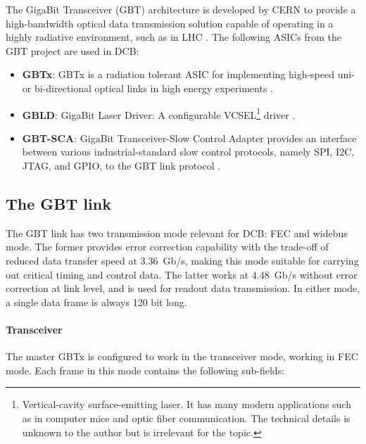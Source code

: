The GigaBit Transceiver (GBT) architecture is developed by CERN to provide a
high-bandwidth optical data transmission solution capable of operating in a
highly radiative environment, such as in LHC \cite{P_Moreira_2010}.
The following ASICs from the GBT project are used in DCB:

\begin{itemize}
    \item \textbf{GBTx}:
        GBTx is a radiation tolerant ASIC for implementing high-speed
        uni- or bi-directional optical links in high energy experiments
        \cite{gbtx_manual}.

    \item \textbf{GBLD}:
        GigaBit Laser Driver:
        A configurable VCSEL\footnote{
            Vertical-cavity surface-emitting laser.
            It has many modern applications such as in computer mice and optic
            fiber communication.
            The technical details is unknown to the author but is irrelevant
            for the topic.
        } driver
        \cite{gbld_manual}.

    \item \textbf{GBT-SCA}:
        GigaBit Transceiver-Slow Control Adapter provides an interface between
        various industrial-standard slow control protocols,
        namely SPI, I2C, JTAG, and GPIO, to the GBT link protocol
        \cite{sca_manual}.
\end{itemize}


\subsection{The GBT link}

The GBT link has two transmission mode relevant for DCB: FEC and widebus mode.
The former provides error correction capability with the trade-off of reduced
data transfer speed at 3.36~Gb/s,
making this mode suitable for carrying out critical timing and control data.
The latter works at 4.48~Gb/s without error correction at link level,
and is used for readout data transmission.
In either mode, a single data frame is always 120 bit long.

\paragraph{Transceiver}
The master GBTx is configured to work in the transceiver mode, working in
FEC mode.
Each frame in this mode contains the following sub-fields:

